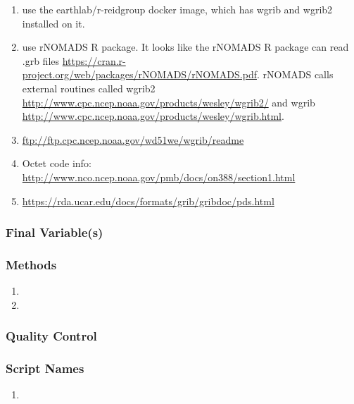 \begin{enumerate}


\item use the earthlab/r-reidgroup docker image, which has wgrib and wgrib2 installed on it.

\item use rNOMADS R package. It looks like the rNOMADS R package can read .grb files \url{https://cran.r-project.org/web/packages/rNOMADS/rNOMADS.pdf}. rNOMADS calls external routines called wgrib2 \url{http://www.cpc.ncep.noaa.gov/products/wesley/wgrib2/} and wgrib \url{http://www.cpc.ncep.noaa.gov/products/wesley/wgrib.html}.

\item \url{ftp://ftp.cpc.ncep.noaa.gov/wd51we/wgrib/readme}

\item Octet code info: \url{http://www.nco.ncep.noaa.gov/pmb/docs/on388/section1.html}

\item \url{https://rda.ucar.edu/docs/formats/grib/gribdoc/pds.html}

\end{enumerate}

\subsubsection*{Final Variable(s)}
\subsubsection*{Methods}
\begin{enumerate}
\item 
\item
\end{enumerate}
\subsubsection*{Quality Control}
\subsubsection*{Script Names}
\begin{enumerate}
\item 
\end{enumerate}

